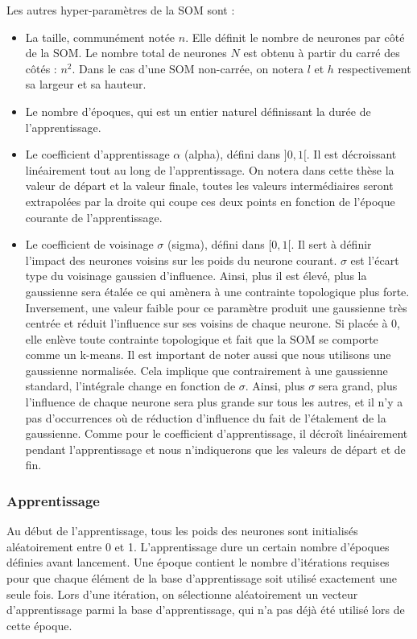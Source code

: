 	Les autres hyper-paramètres de la SOM sont : 
	\begin{itemize}
	\item La taille, communément notée $n$. Elle définit le nombre de neurones par côté de la SOM. Le nombre total de neurones $N$ est obtenu à partir du carré des côtés : $n^2$. Dans le cas d'une SOM non-carrée, on notera $l$ et $h$ respectivement sa largeur et sa hauteur. 
	\item Le nombre d'époques, qui est un entier naturel définissant la durée de l'apprentissage. 
	\item Le coefficient d'apprentissage $\alpha$ (alpha), défini dans $]0,1[$. Il est décroissant linéairement tout au long de l'apprentissage. On notera dans cette thèse la valeur de départ et la valeur finale, toutes les valeurs intermédiaires seront extrapolées par la droite qui coupe ces deux points en fonction de l'époque courante de l'apprentissage. 
	\item Le coefficient de voisinage $\sigma$ (sigma), défini dans $[0,1[$. Il sert à définir l'impact des neurones voisins sur les poids du neurone courant. $\sigma$ est l'écart type du voisinage gaussien d'influence. Ainsi, plus il est élevé, plus la gaussienne sera étalée ce qui amènera à une contrainte topologique plus forte. Inversement, une valeur faible pour ce paramètre produit une gaussienne très centrée et réduit l'influence sur ses voisins de chaque neurone. Si placée à 0, elle enlève toute contrainte topologique et fait que la SOM se comporte comme un k-means. Il est important de noter aussi que nous utilisons une gaussienne normalisée. Cela implique que contrairement à une gaussienne standard, l'intégrale change en fonction de $\sigma$. Ainsi, plus $\sigma$ sera grand, plus l'influence de chaque neurone sera plus grande sur tous les autres, et il n'y a pas d'occurrences où de réduction d'influence du fait de l'étalement de la gaussienne. Comme pour le coefficient d'apprentissage, il décroît linéairement pendant l'apprentissage et nous n'indiquerons que les valeurs de départ et de fin. 
	\end{itemize}
	

\subsubsection{Apprentissage}

	Au début de l'apprentissage, tous les poids des neurones sont initialisés aléatoirement entre 0 et 1. L'apprentissage dure un certain nombre d'époques définies avant lancement. Une époque contient le nombre d'itérations requises pour que chaque élément de la base d'apprentissage soit utilisé exactement une seule fois. Lors d'une itération, on sélectionne aléatoirement un vecteur d'apprentissage parmi la base d'apprentissage, qui n'a pas déjà été utilisé lors de cette époque. 

